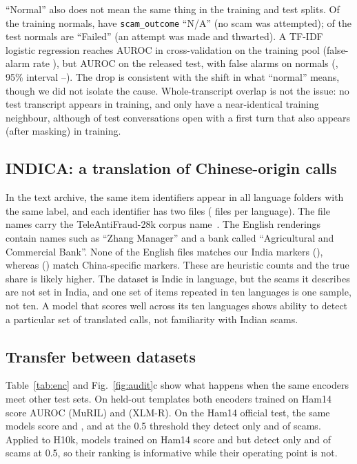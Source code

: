 \documentclass[conference]{IEEEtran}
\begin{document}
\begin{table}[t]
\centering
\caption{ICFD-31k released splits.}
\label{tab:icfd}
\small

\end{table}

``Normal'' also does not mean the same thing in the training and test splits. Of the training normals, \IcfdTrNormalNA{} have \texttt{scam\_outcome} ``N/A'' (no scam was attempted); \IcfdTeNormalFailed{} of the \IcfdTeNormal{} test normals are ``Failed'' (an attempt was made and thwarted). A TF-IDF logistic regression reaches AUROC \IcfdCvAuc{} in cross-validation on the training pool (false-alarm rate \IcfdCvFpr{}), but AUROC \IcfdTeAuc{} on the released test, with \IcfdTeFp{} false alarms on \IcfdTeNormN{} normals (\IcfdTeFpr{}, 95\% interval \IcfdTeFpLo{}--\IcfdTeFpHi{}). The drop is consistent with the shift in what ``normal'' means, though we did not isolate the cause. Whole-transcript overlap is not the issue: no test transcript appears in training, and only \IcfdNNTe{} have a near-identical training neighbour, although \IcfdFirstTurnTe{} of test conversations open with a first turn that also appears (after masking) in training.

\subsection{INDICA: a translation of Chinese-origin calls}
In the text archive, the same \InN{} item identifiers appear in all \InLangs{} language folders with the same label, and each identifier has two files (\InFiles{} files per language). The file names carry the TeleAntiFraud-28k corpus name~\cite{ma2025teleantifraud}. The English renderings contain names such as ``Zhang Manager'' and a bank called ``Agricultural and Commercial Bank''. None of the \InFiles{} English files matches our India markers (\InIndiaN{}), whereas \InChinaN{} (\InChinaPct{}) match China-specific markers. These are heuristic counts and the true share is likely higher. The dataset is Indic in language, but the scams it describes are not set in India, and one set of items repeated in ten languages is one sample, not ten. A model that scores well across its ten languages shows ability to detect a particular set of translated calls, not familiarity with Indian scams.

\subsection{Transfer between datasets}
\label{sec:transfer}
Table~\ref{tab:enc} and Fig.~\ref{fig:audit}c show what happens when the same encoders meet other test sets. On held-out templates both encoders trained on Ham14 score AUROC \MuHamIid{} (MuRIL) and \XlHamIid{} (XLM-R). On the Ham14 official test, the same models score \MuHamOff{} and \XlHamOff{}, and at the 0.5 threshold they detect only \MuHamOffTpr{} and \XlHamOffTpr{} of scams. Applied to H10k, models trained on Ham14 score \MuHamToHk{} and \XlHamToHk{} but detect only \MuHamToHkTpr{} and \XlHamToHkTpr{} of scams at 0.5, so their ranking is informative while their operating point is not.
\end{document}
